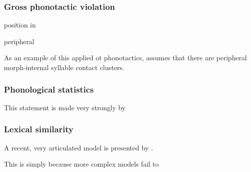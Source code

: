 
\subsubsection{Gross phonotactic violation}

position in \citet{SPE}

\citet{Shibatani1972}
\citet{Hooper1973}

peripheral \citep[in the sense of][81]{LGB}

As an example of this applied ot phonotactics, 
\citet{Borowsky1989} assumes that there are peripheral morph-internal syllable contact clusters. 

\subsubsection{Phonological statistics}

\citet{SPE}

This statement is made very strongly by \citet{Coleman1996}

\subsubsection{Lexical similarity}

\citet{LSLT}

\citet{Greenberg1964}
\citet{Ohala1986b}

A recent, very articulated model is presented by \citet{Bailey2001}.

This is simply because more complex models fail to 

